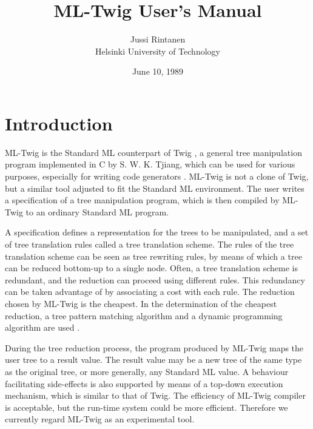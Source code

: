 \setlength{\textwidth}{15cm}
\setlength{\oddsidemargin}{4.6mm} %
\setlength{\evensidemargin}{\oddsidemargin}
\setlength{\textheight}{22cm}
\setlength{\topmargin}{-8mm}
\newcommand{\mltwig}{ML-Twig }

\title{\mltwig User's Manual}
\author{Jussi Rintanen \\ Helsinki University of Technology}
\date{June 10, 1989}


\maketitle

\section{Introduction}

\mltwig is the Standard ML counterpart of Twig
\cite{ahoganapathitjiang,tjiang}, a general tree manipulation program
implemented in C by S. W. K. Tjiang, which can be used for various purposes,
especially for writing code generators \cite{appel}.
\mltwig is not a clone of Twig, but a similar tool adjusted to fit
the Standard ML environment.
The user writes a specification of a tree manipulation program,
which is then compiled by \mltwig to an ordinary Standard ML program.

A specification defines a representation for the trees to be manipulated,
and a set of tree translation rules called a tree translation scheme.
The rules of the tree translation scheme can be seen as tree rewriting
rules, by means of which a tree can be reduced bottom-up to a single node.
Often, a tree translation scheme is redundant, and the reduction can
proceed using different rules. This redundancy can be taken
advantage of by associating a cost with each rule. The reduction chosen
by \mltwig is the cheapest. In the determination of the cheapest
reduction, a tree pattern matching algorithm and a dynamic programming
algorithm are used \cite{ahojohnson,hoffmannodonnell}.

During the tree reduction process, the program produced by \mltwig maps
the user tree to a result value. The result value may be a new tree of
the same type as the original tree, or more generally, any Standard ML value.
A behaviour facilitating side-effects is also supported by means of
a top-down execution mechanism, which is similar to that of Twig.
The efficiency of \mltwig compiler is acceptable, but the run-time system
could be more efficient. Therefore we currently regard \mltwig as
an experimental tool.

